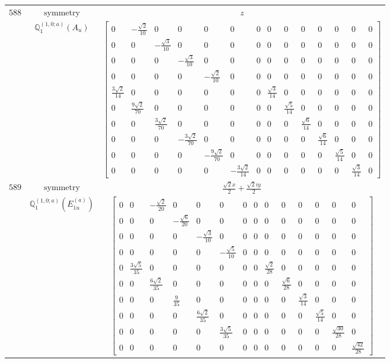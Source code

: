 \documentclass[fleqn,8pt,landscape]{jsarticle}
\begin{document}
\begin{longtable}{ccc}
$ 588 $ & $ \text{symmetry} $ & $ z $ \\
$  $ & $ \mathbb{Q}_{1}^{(1,0;a)}(A_{u}) $ & $ \begin{bmatrix} 0 & - \frac{\sqrt{2}}{10} & 0 & 0 & 0 & 0 & 0 & 0 & 0 & 0 & 0 & 0 & 0 & 0 \\ 0 & 0 & - \frac{\sqrt{3}}{10} & 0 & 0 & 0 & 0 & 0 & 0 & 0 & 0 & 0 & 0 & 0 \\ 0 & 0 & 0 & - \frac{\sqrt{3}}{10} & 0 & 0 & 0 & 0 & 0 & 0 & 0 & 0 & 0 & 0 \\ 0 & 0 & 0 & 0 & - \frac{\sqrt{2}}{10} & 0 & 0 & 0 & 0 & 0 & 0 & 0 & 0 & 0 \\ \frac{3 \sqrt{2}}{14} & 0 & 0 & 0 & 0 & 0 & 0 & \frac{\sqrt{3}}{14} & 0 & 0 & 0 & 0 & 0 & 0 \\ 0 & \frac{9 \sqrt{2}}{70} & 0 & 0 & 0 & 0 & 0 & 0 & \frac{\sqrt{5}}{14} & 0 & 0 & 0 & 0 & 0 \\ 0 & 0 & \frac{3 \sqrt{2}}{70} & 0 & 0 & 0 & 0 & 0 & 0 & \frac{\sqrt{6}}{14} & 0 & 0 & 0 & 0 \\ 0 & 0 & 0 & - \frac{3 \sqrt{2}}{70} & 0 & 0 & 0 & 0 & 0 & 0 & \frac{\sqrt{6}}{14} & 0 & 0 & 0 \\ 0 & 0 & 0 & 0 & - \frac{9 \sqrt{2}}{70} & 0 & 0 & 0 & 0 & 0 & 0 & \frac{\sqrt{5}}{14} & 0 & 0 \\ 0 & 0 & 0 & 0 & 0 & - \frac{3 \sqrt{2}}{14} & 0 & 0 & 0 & 0 & 0 & 0 & \frac{\sqrt{3}}{14} & 0 \end{bmatrix} $ \\ \hline
$ 589 $ & $ \text{symmetry} $ & $ \frac{\sqrt{2} x}{2} + \frac{\sqrt{2} i y}{2} $ \\
$  $ & $ \mathbb{Q}_{1}^{(1,0;a)}(E_{1u}^{(a)}) $ & $ \begin{bmatrix} 0 & 0 & - \frac{\sqrt{2}}{20} & 0 & 0 & 0 & 0 & 0 & 0 & 0 & 0 & 0 & 0 & 0 \\ 0 & 0 & 0 & - \frac{\sqrt{6}}{20} & 0 & 0 & 0 & 0 & 0 & 0 & 0 & 0 & 0 & 0 \\ 0 & 0 & 0 & 0 & - \frac{\sqrt{3}}{10} & 0 & 0 & 0 & 0 & 0 & 0 & 0 & 0 & 0 \\ 0 & 0 & 0 & 0 & 0 & - \frac{\sqrt{5}}{10} & 0 & 0 & 0 & 0 & 0 & 0 & 0 & 0 \\ 0 & \frac{3 \sqrt{5}}{35} & 0 & 0 & 0 & 0 & 0 & 0 & \frac{\sqrt{2}}{28} & 0 & 0 & 0 & 0 & 0 \\ 0 & 0 & \frac{6 \sqrt{2}}{35} & 0 & 0 & 0 & 0 & 0 & 0 & \frac{\sqrt{6}}{28} & 0 & 0 & 0 & 0 \\ 0 & 0 & 0 & \frac{9}{35} & 0 & 0 & 0 & 0 & 0 & 0 & \frac{\sqrt{3}}{14} & 0 & 0 & 0 \\ 0 & 0 & 0 & 0 & \frac{6 \sqrt{2}}{35} & 0 & 0 & 0 & 0 & 0 & 0 & \frac{\sqrt{5}}{14} & 0 & 0 \\ 0 & 0 & 0 & 0 & 0 & \frac{3 \sqrt{5}}{35} & 0 & 0 & 0 & 0 & 0 & 0 & \frac{\sqrt{30}}{28} & 0 \\ 0 & 0 & 0 & 0 & 0 & 0 & 0 & 0 & 0 & 0 & 0 & 0 & 0 & \frac{\sqrt{42}}{28} \end{bmatrix} $ \\ \hline

\end{longtable}
\end{document}
